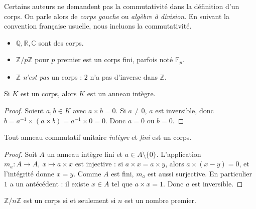 \begin{remarque}
Certains auteurs ne demandent pas la commutativité dans la définition d'un corps. On parle alors de \emph{corps gauche} ou \emph{algèbre à division}. En suivant la convention française usuelle, nous incluons la commutativité.
\end{remarque}

\begin{exemple}
\begin{itemize}
    \item $\mathbb{Q}, \mathbb{R}, \mathbb{C}$ sont des corps.
    \item $\mathbb{Z}/p\mathbb{Z}$ pour $p$ premier est un corps fini, parfois noté $\mathbb{F}_p$.
    \item $\mathbb{Z}$ \emph{n'est pas} un corps : $2$ n'a pas d'inverse dans $\mathbb{Z}$.
\end{itemize}
\end{exemple}

\begin{proposition}
Si $K$ est un corps, alors $K$ est un anneau intègre.
\end{proposition}

\begin{proof}
Soient $a, b \in K$ avec $a \times b = 0$. Si $a \neq 0$, $a$ est inversible, donc $b = a^{-1} \times (a \times b) = a^{-1} \times 0 = 0$. Donc $a = 0$ ou $b = 0$.
\end{proof}

\begin{theoreme}[Anneau intègre fini = corps]
Tout anneau commutatif unitaire \emph{intègre} et \emph{fini} est un corps.
\end{theoreme}

\begin{proof}
Soit $A$ un anneau intègre fini et $a \in A \setminus \{0\}$. L'application $m_a : A \to A,\ x \mapsto a \times x$ est injective : si $a \times x = a \times y$, alors $a \times (x - y) = 0$, et l'intégrité donne $x = y$. Comme $A$ est fini, $m_a$ est aussi surjective. En particulier $1$ a un antécédent : il existe $x \in A$ tel que $a \times x = 1$. Donc $a$ est inversible.
\end{proof}

\begin{corollaire}
$\mathbb{Z}/n\mathbb{Z}$ est un corps si et seulement si $n$ est un nombre premier.
\end{corollaire}

